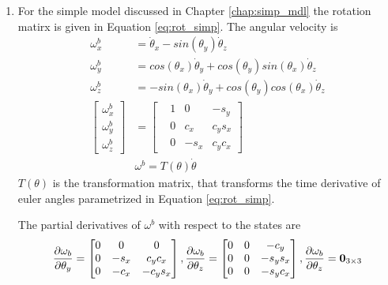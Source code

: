 \begin{enumerate}
\item For the simple model discussed in Chapter \ref{chap:simp_mdl} the rotation matirx is given in Equation \ref{eq:rot_simp}. The angular velocity is
\begin{equation}
	\begin{split}
	\omega_x^b &= \dot{\theta}_x - sin(\theta_y)\dot{\theta}_z \\
	\omega_y^b &= cos(\theta_x)\dot{\theta}_y + cos(\theta_y)sin(\theta_x)\dot{\theta}_z \\
	\omega_z^b &= -sin(\theta_x)\dot{\theta}_y + cos(\theta_y)cos(\theta_x)\dot{\theta}_z \\
	\begin{bmatrix}
	\omega_x^b\\ \omega_y^b\\ \omega_z^b
	\end{bmatrix}
	 &= 
	\begin{bmatrix}
	 &1 &0 &-s_y\\
	 &0  &c_x &c_ys_x\\
	 &0  &-s_x &c_yc_x
	\end{bmatrix} \\
	&\omega^b = T(\theta) \dot{\theta}
	\end{split}
\end{equation}
$T(\theta)$ is the transformation matrix, that transforms the time derivative of euler angles parametrized in Equation \ref{eq:rot_simp}.

The partial derivatives of $\omega^b$ with respect to the states are
$$\frac{\partial {\omega_b}}{\partial {\theta_y}} = \begin{bmatrix}0 &0 &0\\ 0 &-s_x &c_yc_x\\ 0 &-c_x &-c_ys_x \end{bmatrix}, \frac{\partial {\omega_b}}{\partial {\theta_z}} = \begin{bmatrix}0 &0 &-c_y\\ 0 &0 &-s_ys_x\\ 0 &0 &-s_yc_x \end{bmatrix},\frac{\partial {\omega_b}}{\partial {\theta_z}} = \textbf{0}_{3\times 3} $$
\end{enumerate}
